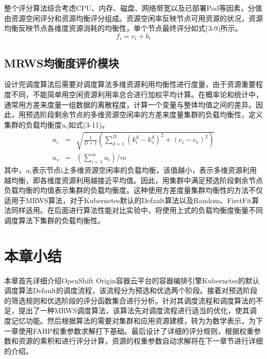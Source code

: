 整个评分算法综合考虑CPU、内存、磁盘、网络带宽以及已部署Pod等因素，分值由资源空闲评分和资源均衡评分组成。资源空闲率反映节点可用资源的状况，资源均衡反映节点各维度资源消耗的均衡性，单个节点最终评分如式(3-9)所示。
\begin{equation}
f_{i} = v_{i}+b_{i}
\end{equation}

\subsection{MRWS均衡度评价模块}
设计完调度算法后需要对调度算法多维资源利用均衡性进行度量，由于资源重要程度不同，不能简单用空闲资源利用率总合进行加权平均计算。在概率论和统计中，通常用方差来度量一组数据的离散程度，计算一个变量与整体均值之间的差异。因此，用预选阶段剩余节点的多维资源空闲率的方差来度量集群的负载均衡性，定义集群的负载均衡度$u_{v}$如式(3-11)。
\begin{eqnarray}
	u_{i} &=& \sqrt{\frac{1}{D+1}(\sum_{d=1}^{D}(k_{i}^{d}-k_{v}^{d})^{2}+(c_{i}-c_{v})^{2})} \\[0.3cm]
	u_{v} &=& (\sum_{i=1}^{m}u_{i})/m
\end{eqnarray}
其中，\begin{math}u_{i}\end{math}表示节点i上多维资源空闲率的负载均衡，该值越小，表示多维资源利用越均衡，即各维度资源利用越接近平均值。因此，用集群中满足预选阶段剩余节点负载均衡的均值表示集群的负载均衡度。这种使用方差度量集群均衡性的方法不仅适用于MRWS算法，对于Kubernetes默认的Default算法以及Random、FirstFit算法同样适用。在后面进行算法性能对比实验中，将使用上式的负载均衡度衡量不同调度算法下集群的负载均衡性。

\section{本章小结}
本章首先详细介绍OpenShift Origin容器云平台的容器编排引擎Kubernetes的默认调度算法Default的调度流程，该流程分为预选和优选两个阶段。接着对预选阶段的筛选规则和优选阶段的评分函数集合进行分析。针对其调度流程和调度算法的不足，提出了一种MRWS调度算法，该算法先对调度流程进行适当的优化，使其调度记忆功能。然后根据算法的需要对集群和应用资源建模，转为为数学表示，为下一章使用FAHP权重参数求解打下基础。最后设计了详细的评分规则，根据权重参数和资源的乘积和进行评分计算，资源的权重参数自动求解将在下一章节进行详细的介绍。




